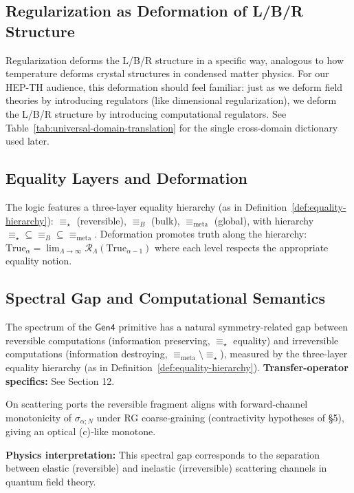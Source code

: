 \subsection{Regularization as Deformation of L/B/R Structure}

Regularization deforms the L/B/R structure in a specific way, analogous to how temperature deforms crystal structures in condensed matter physics. For our HEP-TH audience, this deformation should feel familiar: just as we deform field theories by introducing regulators (like dimensional regularization), we deform the L/B/R structure by introducing computational regulators. See Table~\ref{tab:universal-domain-translation} for the single cross-domain dictionary used later.

\subsection{Equality Layers and Deformation}

The logic features a three-layer equality hierarchy (as in Definition~\ref{def:equality-hierarchy}): $\equiv_\star$ (reversible), $\equiv_B$ (bulk), $\equiv_{\text{meta}}$ (global), with hierarchy $\equiv_\star \subseteq \equiv_B \subseteq \equiv_{\text{meta}}$. Deformation promotes truth along the hierarchy: $\text{True}_\alpha = \lim_{\Lambda \to \infty} \mathcal{R}_\Lambda(\text{True}_{\alpha-1})$ where each level respects the appropriate equality notion.

\subsection{Spectral Gap and Computational Semantics}

The spectrum of the $\mathsf{Gen4}$ primitive has a natural symmetry-related gap between reversible computations (information preserving, $\equiv_\star$ equality) and irreversible computations (information destroying, $\equiv_{\text{meta}} \setminus \equiv_\star$), measured by the three-layer equality hierarchy (as in Definition~\ref{def:equality-hierarchy}). \textbf{Transfer-operator specifics:} See Section 12.

On scattering ports the reversible fragment aligns with forward‑channel monotonicity of $\sigma_{\alpha;N}$ under RG coarse‑graining (contractivity hypotheses of §5), giving an optical (c)‑like monotone.

\textbf{Physics interpretation:} This spectral gap corresponds to the separation between elastic (reversible) and inelastic (irreversible) scattering channels in quantum field theory.

